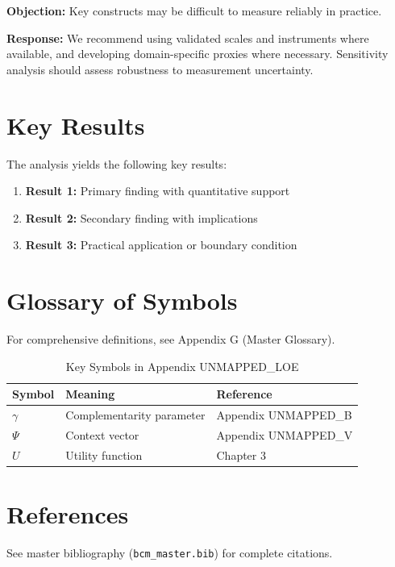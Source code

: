 \textbf{Objection:} Key constructs may be difficult to measure reliably in
practice.

\textbf{Response:} We recommend using validated scales and instruments where
available, and developing domain-specific proxies where necessary. Sensitivity
analysis should assess robustness to measurement uncertainty.





\section{Key Results}
\label{sec:loe-results}

The analysis yields the following key results:

\begin{enumerate}
    \item \textbf{Result 1:} Primary finding with quantitative support
    \item \textbf{Result 2:} Secondary finding with implications
    \item \textbf{Result 3:} Practical application or boundary condition
\end{enumerate}

\section{Glossary of Symbols}
\label{sec:loe-glossary}

For comprehensive definitions, see Appendix G (Master Glossary).

\begin{table}[htbp]
\centering
\caption{Key Symbols in Appendix UNMAPPED_LOE}
\begin{tabular}{lll}
\toprule
\textbf{Symbol} & \textbf{Meaning} & \textbf{Reference} \\
\midrule
$\gamma$ & Complementarity parameter & Appendix UNMAPPED_B \\
$\Psi$ & Context vector & Appendix UNMAPPED_V \\
$U$ & Utility function & Chapter 3 \\
\bottomrule
\end{tabular}
\end{table}


\section{References}
\label{sec:loe-references}

See master bibliography (\texttt{bcm\_master.bib}) for complete citations.

\nocite{bcm_master}

